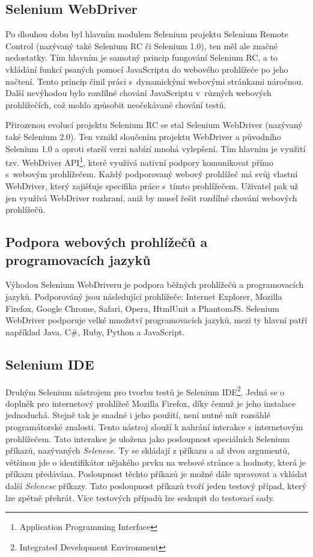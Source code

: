 \documentclass[
    color,   %
	table,   %
    twoside, %
]{fithesis3}
\begin{document}
\subsection{Selenium WebDriver}
Po dlouhou dobu byl hlavním modulem Selenium projektu Selenium Remote Control (nazývaný také Selenium RC či Selenium 1.0), ten měl ale značné nedostatky. Tím hlavním je samotný princip fungování Selenium RC, a to vkládání funkcí psaných pomocí JavaScriptu do webového prohlížeče po jeho načtení. Tento princip činil práci s~dynamickými webovými stránkami náročnou. Další nevýhodou bylo rozdílné chování JavaScriptu v~různých webových prohlížečích, což mohlo způsobit neočekávané chování testů.

Přirozenou evolucí projektu Selenium RC se stal Selenium WebDriver (nazývaný také Selenium 2.0). Ten vznikl sloučením projektu WebDriver a původního Selenium 1.0 a oproti starší verzi nabízí mnohá vylepšení. Tím hlavním je využití tzv. WebDriver API\footnote{Application Programming Interface}, které využívá nativní podpory komunikovat přímo s~webovým prohlížečem. Každý podporovaný webový prohlížeč má svůj vlastní WebDriver, který zajišťuje specifika práce s~tímto prohlížečem. Uživatel pak už jen využívá WebDriver rozhraní, aniž by musel řešit rozdílné chování webových prohlížečů. 

\subsection*{Podpora webových prohlížečů a programovacích jazyků}
Výhodou Selenium WebDriveru je podpora běžných prohlížečů a programovacích jazyků. Podporováný jsou následující prohlížeče: Internet Explorer, Mozilla Firefox, Google Chrome, Safari, Opera, HtmlUnit a PhantomJS. Selenium WebDriver podporuje velké množství programovacích jazyků, mezi ty hlavní patří například Java, C\#, Ruby, Python a JavaScript.

\subsection{Selenium IDE}

Druhým Selenium nástrojem pro tvorbu testů je Selenium IDE\footnote{Integrated Development Environment}. Jedná se o doplněk pro internetový prohlížeč Mozilla Firefox, díky čemuž je jeho instalace jednoduchá. Stejně tak je snadné i jeho použití, není nutné mít rozsáhlé programátorské znalosti. Tento nástroj slouží k nahrání interakce s internetovým prohlížečem. Tato interakce je uložena jako posloupnost speciálních Selenium příkazů, nazývaných \emph{Selenese}. Ty se skládají z příkazu a až dvou argumentů, většinou jde o identifikátor nějakého prvku na webové stránce a hodnoty, která je příkazu předávána. Posloupnost těchto příkazů je možné dále upravovat a vkládat další \emph{Selenese} příkazy. Tato posloupnost příkazů tvoří jeden testový případ, který lze zpětně přehrát. Více testových případů lze seskupit do testovací sady. \cite{Selenium}
\end{document}

